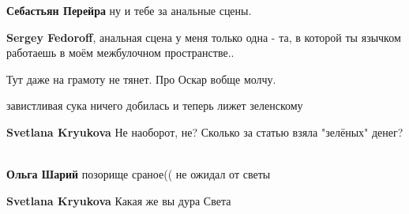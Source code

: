 \begin{itemize}
\begin{itemize}
\textbf{Себастьян Перейра} ну и тебе за анальные сцены.

 
\textbf{Sergey Fedoroff}, анальная сцена у меня только одна - та, в которой ты язычком работаешь в моём межбулочном пространстве..

 
Тут даже на грамоту не тянет. Про Оскар вобще молчу.

 
завистливая сука ничего добилась и теперь лижет зеленскому

 
\textbf{Svetlana Kryukova} Не наоборот, не? Сколько за статью взяла "зелёных" денег?🤣🤣🤣🤦🏻‍♂️

 
\textbf{Ольга Шарий} позорище сраное(( не ожидал от светы

 
\textbf{Svetlana Kryukova} Какая же вы дура Света

 

\end{itemize}
\end{itemize}
